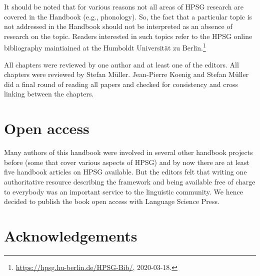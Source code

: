 \begin{refsection}
It should be noted that for various reasons not all areas of HPSG research are covered in the
Handbook (e.g., phonology). So, the fact that a particular topic is not addressed in the Handbook
should not be interpreted as an absence of research on the topic. Readers interested in such topics
refer to the HPSG online bibliography maintiained at the Humboldt Universität zu Berlin.\footnote{%
\url{https://hpsg.hu-berlin.de/HPSG-Bib/}, 2020-03-18.
}

All chapters were reviewed by one author and at least one of the editors. All chapters were reviewed
by Stefan Müller. Jean-Pierre Koenig and Stefan Müller did a final round of reading all papers and
checked for consistency and cross linking between the chapters.


\section*{Open access}


Many authors of this handbook were involved in several other handbook projects before (some that cover various aspects of HPSG) and by now there are at least five handbook articles on HPSG available. But the editors felt that writing one authoritative resource describing the framework and being available free of charge to everybody was an important service to the linguistic community. We hence decided to publish the book open access with Language Science Press.


\section*{Acknowledgements}


\end{refsection}
